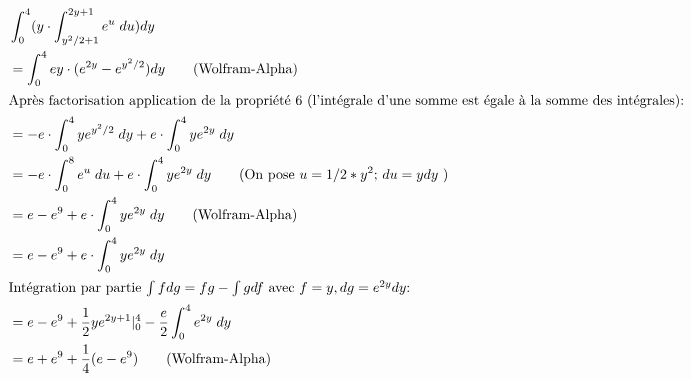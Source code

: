 \documentclass[letterpaper,12pt,oneside,final]{book}
\begin{document}
\begin{align*}
   & \int_0^4 (y \cdot \int_{y^2/2 + 1}^{2y + 1} e^{u} \; du) dy \\
   &= \int_0^4 ey \cdot (e^{2y} - e^{y^2/2}) dy \qquad \text{(Wolfram-Alpha)} \\ 
   \intertext{Après factorisation application de la propriété 6 (l'intégrale d'une somme est égale à la somme des intégrales): }
  &= -e \cdot \int_0^4 ye^{y^2/2} \; dy + e \cdot \int_0^4 ye^{2y} \; dy \\
  &= -e \cdot \int_0^8 e^u \; du + e \cdot \int_0^4 ye^{2y} \; dy \qquad 
    \text{(On pose $u = 1/2 * y^2$; $du = ydy$ )} \\
  &= e -e^9 + e \cdot \int_0^4 ye^{2y} \; dy \qquad \text{(Wolfram-Alpha)} \\
  &= e -e^9 + e \cdot \int_0^4 ye^{2y} \; dy \\
  \intertext{Intégration par partie $\int fdg = fg - \int gdf$ avec $f = y, dg = e^{2y}dy$: }
  &= e - e^9 + \dfrac{1}{2}ye^{2y+1}|^4_0 - \dfrac{e}{2} \int_0^4 e^{2y} \; dy \\
  &= e + e^9 + \dfrac{1}{4}(e - e^9) \qquad \text{(Wolfram-Alpha)} \\
\end{align*}
\end{document}

